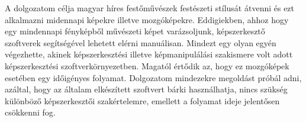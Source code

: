 \documentclass[12pt, a4paper, oneside]{book}
\theoremstyle{tetel}
\begin{document}
\newline
\indent
A dolgozatom célja magyar híres festőművészek festészeti stílusát átvenni és ezt alkalmazni midennapi képekre illetve mozgóképekre. Eddigiekben, ahhoz hogy egy mindennapi fényképből művészeti képet varázsoljunk, képszerkesztő szoftverek segítségével lehetett elérni manuálisan. Mindezt egy olyan egyén végezhette, akinek képszerkesztési illetve képmanipulálási szakismere volt adott képszerkesztési szoftverkörnyezetben. Magatól értődik az, hogy ez mozgóképek esetében egy időigényes folyamat. Dolgozatom mindezekre megoldást próbál adni, azáltal, hogy az általam elkészített szoftvert bárki használhatja, nincs szükség különböző képszerkesztői szakértelemre, emellett a folyamat ideje jelentősen csökkenni fog. 

\end{document}
